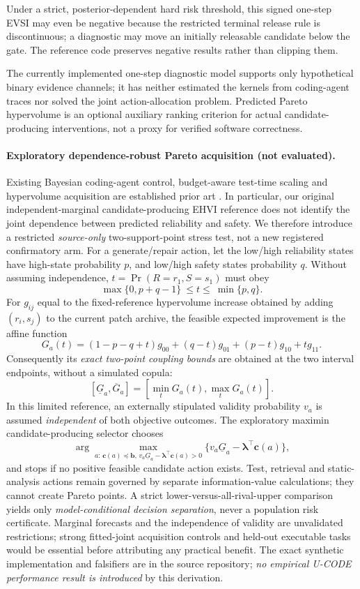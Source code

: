 \documentclass[pdflatex,sn-basic]{sn-jnl}
\begin{document}
Under a strict, posterior-dependent hard risk threshold, this signed
one-step EVSI may even be negative because the restricted terminal
release rule is discontinuous; a diagnostic may move an initially
releasable candidate below the gate. The reference code preserves
negative results rather than clipping them.

The currently implemented one-step diagnostic model supports only
hypothetical binary evidence channels; it has neither estimated the
kernels from coding-agent traces nor solved the joint action-allocation
problem. Predicted Pareto hypervolume is an optional auxiliary ranking
criterion for actual candidate-producing interventions, not a proxy
for verified software correctness.


\paragraph{Exploratory dependence-robust Pareto acquisition (not evaluated).}
Existing Bayesian coding-agent control, budget-aware test-time scaling and
hypervolume acquisition are established prior art
\cite{papamarkou2026bayesiancontrol,liu2026cats,deng2025ehvi,ma2026agenticverifier}.
In particular, our original independent-marginal candidate-producing
EHVI reference does not identify the joint dependence between predicted
reliability and safety. We therefore introduce a restricted \emph{source-only}
two-support-point stress test, not a new registered confirmatory arm.
For a generate/repair action, let the low/high reliability states have
high-state probability $p$, and low/high safety states probability $q$.
Without assuming independence, $t=\Pr(R=r_1,S=s_1)$ must obey
\[
 \max\{0,p+q-1\}\ \le t \le\ \min\{p,q\}.
\]
For $g_{ij}$ equal to the fixed-reference hypervolume increase obtained
by adding $(r_i,s_j)$ to the current patch archive, the feasible
expected improvement is the affine function
\[
 G_a(t)=(1-p-q+t)g_{00}+(q-t)g_{01}
       +(p-t)g_{10}+t g_{11}.
\]
Consequently its \emph{exact two-point coupling bounds} are obtained at
the two interval endpoints, without a simulated copula:
\[
 [\underline{G}_a,\overline{G}_a]
 = [\min_{t}G_a(t),\max_{t}G_a(t)].
\]
In this limited reference, an externally stipulated validity
probability $v_a$ is assumed \emph{independent} of both objective outcomes.
The exploratory maximin candidate-producing selector chooses
\[
 \arg\max_{a:\,\mathbf c(a)\preceq\mathbf b,\,
   v_a\underline{G}_a-\boldsymbol\lambda^\top\mathbf c(a)>0}
 \{v_a\underline{G}_a-\boldsymbol\lambda^\top\mathbf c(a)\},
\]
and stops if no positive feasible candidate action exists. Test,
retrieval and static-analysis actions remain governed by separate
information-value calculations; they cannot create Pareto points.
A strict lower-versus-all-rival-upper comparison yields only
\emph{model-conditional decision separation}, never a population risk
certificate. Marginal forecasts and the independence of validity are
unvalidated restrictions; strong fitted-joint acquisition controls and
held-out executable tasks would be essential before attributing any
practical benefit. The exact synthetic implementation and falsifiers are
in the source repository; \emph{no empirical U-CODE performance result
is introduced} by this derivation.
\end{document}

